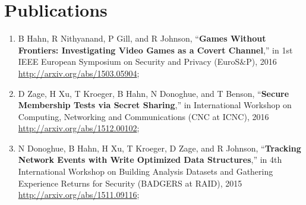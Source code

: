 \documentclass[11pt,a4paper,sans]{moderncv}        %
\begin{document}
\section{Publications}
\begin{enumerate}
	\item  B Hahn, R Nithyanand, P Gill, and R Johnson, “\textbf{Games Without Frontiers: Investigating Video Games as a Covert Channel},” in 1st IEEE European Symposium on Security and Privacy (EuroS\&P), 2016 \\ \url{http://arxiv.org/abs/1503.05904};
	\item D Zage, H Xu, T Kroeger, B Hahn, N Donoghue, and T Benson, “\textbf{Secure Membership Tests via Secret Sharing},” in International Workshop on Computing, Networking and Communications (CNC at ICNC), 2016 \\
	\url{http://arxiv.org/abs/1512.00102};
	\item N Donoghue, B Hahn, H Xu, T Kroeger, D Zage, and R Johnson, “\textbf{Tracking Network Events with Write Optimized Data Structures},” in 4th International Workshop on Building Analysis Datasets and Gathering Experience Returns for Security (BADGERS at RAID), 2015\\
	\url{http://arxiv.org/abs/1511.09116};
\end{enumerate}
\end{document}
